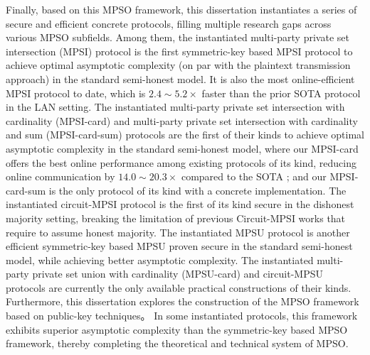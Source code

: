 \begin{enabstract}
    Finally, based on this MPSO framework, this dissertation instantiates a series of secure and efficient concrete protocols, filling multiple research gaps across various MPSO subfields. Among them, the instantiated multi-party private set intersection (MPSI) protocol is the first symmetric-key based MPSI protocol to achieve optimal asymptotic complexity (on par with the plaintext transmission approach) in the standard semi-honest model. It is also the most online-efficient MPSI protocol to date, which is $2.4 \sim 5.2 \times$ faster than the prior SOTA protocol \cite{WuYC24} in the LAN setting. The instantiated multi-party private set intersection with cardinality (MPSI-card) and multi-party private set intersection with cardinality and sum (MPSI-card-sum) protocols are the first of their kinds to achieve optimal asymptotic complexity in the standard semi-honest model, where our MPSI-card offers the best online performance among existing protocols of its kind, reducing online communication by $14.0 \sim 20.3 \times$ compared to the SOTA \cite{ChenDGB22}; and our MPSI-card-sum is the only protocol of its kind with a concrete implementation. The instantiated circuit-MPSI protocol is the first of its kind secure in the dishonest majority setting, breaking the limitation of previous Circuit-MPSI works that require to assume honest majority. The instantiated MPSU protocol is another efficient symmetric-key based MPSU proven secure in the standard semi-honest model, while achieving better asymptotic complexity. The instantiated multi-party private set union with cardinality (MPSU-card) and circuit-MPSU protocols are currently the only available practical constructions of their kinds. 
    Furthermore, this dissertation explores the construction of the MPSO framework based on public-key techniques。 In some instantiated protocols, this framework exhibits superior asymptotic complexity than the symmetric-key based MPSO framework, thereby completing the theoretical and technical system of MPSO.


\end{enabstract}